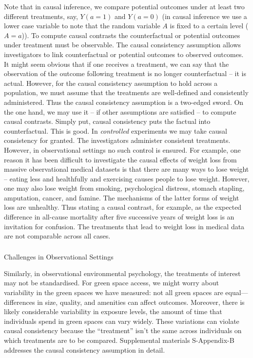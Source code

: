 \documentclass[
  singlecolumn]{article}
\makeatletter
\let\oldsubparagraph\subparagraph
\renewcommand{\subparagraph}{
    \@ifstar
      \xxxSubParagraphStar
      \xxxSubParagraphNoStar
  }
\newcommand{\xxxSubParagraphStar}[1]{\oldsubparagraph*{#1}\mbox{}}
\newcommand{\xxxSubParagraphNoStar}[1]{\oldsubparagraph{#1}\mbox{}}
\makeatother
\begin{document}
Note that in causal inference, we compare potential outcomes under at
least two different treatments, say, \(Y(a = 1)\) and \(Y(a = 0)\) (in
causal inference we use a lower case variable to note that the random
variable \(A\) is fixed to a certain level (\(A = a\))). To compute
causal contrasts the counterfactual or potential outcomes under
treatment must be observable. The causal consistency assumption allows
investigators to link counterfactual or potential outcomes to observed
outcomes. It might seem obvious that if one receives a treatment, we can
say that the observation of the outcome following treatment is no longer
counterfactual -- it is actual. However, for the causal consistency
assumption to hold across a population, we must assume that the
treatments are well-defined and consistently administered. Thus the
causal consistency assumption is a two-edged sword. On the one hand, we
may use it -- if other assumptions are satisfied -- to compute causal
contrasts. Simply put, causal consistency puts the factual into
counterfactual. This is good. In \emph{controlled} experiments we may
take causal consistency for granted. The investigators administer
consistent treatments. However, in observational settings no such
control is ensured. For example, one reason it has been difficult to
investigate the causal effects of weight loss from massive observational
medical datasets is that there are many ways to lose weight -- eating
less and healthfully and exercising causes people to lose weight.
However, one may also lose weight from smoking, psychological distress,
stomach stapling, amputation, cancer, and famine. The mechanisms of the
latter forms of weight loss are unhealthy. Thus stating a causal
contrast, for example, as the expected difference in all-cause mortality
after five successive years of weight loss is an invitation for
confusion. The treatments that lead to weight loss in medical data are
not comparable across all cases.

\subparagraph{Challenges in Observational
Settings}\label{challenges-in-observational-settings-1}

Similarly, in observational environmental psychology, the treatments of
interest may not be standardised. For green space access, we might worry
about variability in the green spaces we have measured: not all green
spaces are equal---differences in size, quality, and amenities can
affect outcomes. Moreover, there is likely considerable variability in
exposure levels, the amount of time that individuals spend in green
spaces can vary widely. These variations can violate causal consistency
because the ``treatment'' isn't the same across individuals on which
treatments are to be compared. Supplemental materials S-Appendix-B
addresses the causal consistency assumption in detail.
\end{document}
